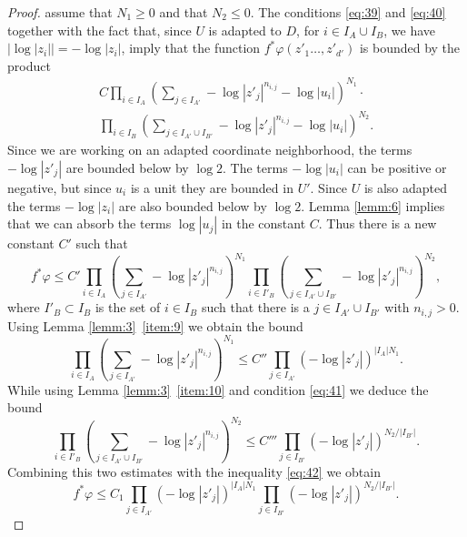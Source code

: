 \documentclass[11pt,a4paper]{amsart}
\numberwithin{equation}{section}
\theoremstyle{plain}
\theoremstyle{definition}
\begin{document}
\begin{proof}
  assume that $N_{1}\ge 0$ and that $N_{2}\le 0$. The conditions
  \eqref{eq:39} and \eqref{eq:40} together  with the fact that, since $U$ is adapted to $D$, for $i\in
  I_{A}\cup I_{B}$, we have $|\log|z_i||=-\log|z_i|$, 
  imply that the function $ f^{\ast}\varphi(z'_{1}\dots,z'_{d'})$ is
  bounded by the product  
  \begin{multline*}
    C\prod_{i\in I_{A}} \left(\sum_{j\in
        I_{A'}}-\log|z'_{j}|^{n_{i,j}}-\log|u_{i}|\right)^{N_{1}}\cdot
    \\
    \prod_{i\in I_{B}} \left(\sum_{j\in I_{A'}\cup I_{B'}}-\log|z'_{j}|^{n_{i,j}}-\log|u_{i}|\right)^{N_{2}}.
  \end{multline*}
  Since we are working on an adapted coordinate neighborhood, the
  terms $-\log |z'_{j}|$ are bounded below by $\log 2$. The terms
  $-\log |u_{i}|$ can be positive or negative, but since $u_{i}$ is a
  unit they are bounded in $U'$. Since $U$ is also adapted the terms
  $-\log|z_{i}|$ are also bounded below by $\log 2$. Lemma
  \ref{lemm:6} implies that we can absorb the terms $\log|u_{j}|$ in
  the constant $C$. Thus there is a new constant $C'$ such that     
  \begin{equation}\label{eq:42}
    f^{\ast}\varphi\le 
    C'\prod_{i\in I_{A}} \left(\sum_{j\in I_{A'}}-\log|z'_{j}|^{n_{i,j}}\right)^{N_{1}}
    \prod_{i\in I'_{B}} \left(\sum_{j\in I_{A'}\cup I_{B'}}-\log|z'_{j}|^{n_{i,j}}\right)^{N_{2}},
  \end{equation}
  where $I'_{B}\subset I_{B}$ is the set of $i\in I_{B}$ such that
  there is a $j\in I_{A'}\cup I_{B'}$ with $n_{i,j}>0$. 
  Using Lemma \ref{lemm:3}~\ref{item:9} we obtain the bound
  \begin{displaymath}
    \prod_{i\in I_{A}} \left(\sum_{j\in
        I_{A'}}-\log|z'_{j}|^{n_{i,j}}\right)^{N_{1}}
    \le C''  \prod_{j\in I_{A'}}(-\log|z'_{j}|)^{|I_A|N_{1}}. 
  \end{displaymath}
  While using Lemma \ref{lemm:3}~\ref{item:10} and condition
  \eqref{eq:41} we deduce the bound
  \begin{displaymath}
    \prod_{i\in I'_{B}} \left(\sum_{j\in I_{A'}\cup
        I_{B'}}-\log|z'_{j}|^{n_{i,j}}\right)^{N_{2}}\le
    C''' \prod_{j\in I_{B'}} (-\log|z'_{j}|)^{N_{2}/|I_{B'}|}.
  \end{displaymath}
  Combining this two estimates with the inequality \eqref{eq:42} we
  obtain
  \begin{displaymath}
    f^{\ast}\varphi\le 
    C_{1}\prod_{j\in I_{A'}} (-\log|z'_{j}|)^{|I_{A}|N_{1}}
    \prod_{j\in I_{B'}} (-\log|z'_{j}|)^{N_{2}/|I_{B'}|}.

\end{displaymath}
\end{proof}
\end{document}
